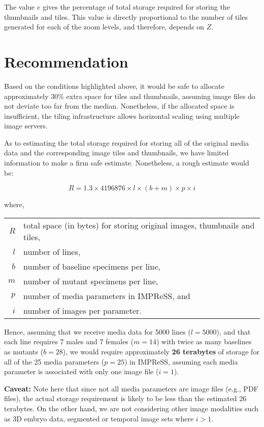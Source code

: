 \documentclass[a4paper]{amsart}
\begin{document}
The value $e$ gives the percentage of total storage required for
storing the thumbnails and tiles. This value is directly proportional to the
number of tiles generated for each of the zoom levels, and therefore,
depends on $Z$.

\section{Recommendation}

Based on the conditions highlighted above, it would be safe to allocate
approximately 30\% extra space for tiles and thumbnails, assuming
image files do not deviate too far from the median. Nonetheless, if
the allocated space is insufficient, the tiling infrastructure allows
horizontal scaling using multiple image servers.

As to estimating the total storage required for storing all of the
original media data and the corresponding image tiles and thumbnails,
we have limited information to make a firm safe estimate. Nonetheless,
a rough estimate would be:

$$
R = 1.3 \times 4196876 \times l \times (b + m) \times p \times i
$$

where,
\begin{table}[h]
\begin{tabular}{rl}
$R$ & total space (in bytes) for storing original images, thumbnails and tiles,\\
$l$ & number of lines,\\
$b$ & number of baseline specimens per line,\\
$m$ & number of mutant specimens per line,\\
$p$ & number of media parameters in IMPReSS, and\\
$i$ & number of images per parameter.
\end{tabular}
\end{table}

Hence, assuming that we receive media data for 5000 lines ($l =
5000$), and that each line requires 7 males and 7 females ($m = 14$)
with twice as many baselines as mutants ($b = 28$), we would require
approximately \textbf{26 terabytes} of storage for all of the 25 media
parameters ($p = 25$) in IMPReSS, assuming each media parameter is
associated with only one image file ($i = 1$).

\textbf{Caveat:} Note here that since not all media parameters are
image files (e.g., PDF files), the actual storage requirement is
likely to be less than the estimated 26 terabytes. On the other hand,
we are not considering other image modalities such as 3D embryo data,
segmented or temporal image sets where $i > 1$.
\end{document}
